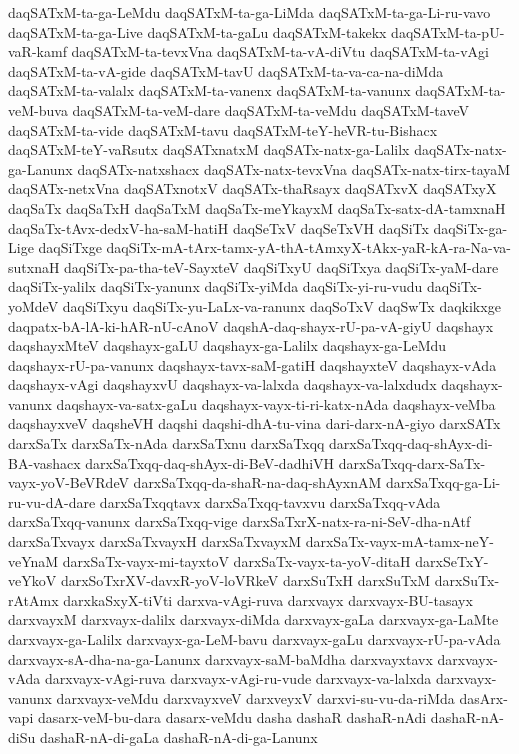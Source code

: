 {daqSATxM-ta-ga-LeMdu
daqSATxM-ta-ga-LiMda
daqSATxM-ta-ga-Li-ru-vavo
daqSATxM-ta-ga-Live
daqSATxM-ta-gaLu
daqSATxM-takekx
daqSATxM-ta-pU-vaR-kamf
daqSATxM-ta-tevxVna
daqSATxM-ta-vA-diVtu
daqSATxM-ta-vAgi
daqSATxM-ta-vA-gide
daqSATxM-tavU
daqSATxM-ta-va-ca-na-diMda
daqSATxM-ta-valalx
daqSATxM-ta-vanenx
daqSATxM-ta-vanunx
daqSATxM-ta-veM-buva
daqSATxM-ta-veM-dare
daqSATxM-ta-veMdu
daqSATxM-taveV
daqSATxM-ta-vide
daqSATxM-tavu
daqSATxM-teY-heVR-tu-Bishacx
daqSATxM-teY-vaRsutx
daqSATxnatxM
daqSATx-natx-ga-Lalilx
daqSATx-natx-ga-Lanunx
daqSATx-natxshacx
daqSATx-natx-tevxVna
daqSATx-natx-tirx-tayaM
daqSATx-netxVna
daqSATxnotxV
daqSATx-thaRsayx
daqSATxvX
daqSATxyX
daqSaTx
daqSaTxH
daqSaTxM
daqSaTx-meYkayxM
daqSaTx-satx-dA-tamxnaH
daqSaTx-tAvx-dedxV-ha-saM-hatiH
daqSeTxV
daqSeTxVH
daqSiTx
daqSiTx-ga-Lige
daqSiTxge
daqSiTx-mA-tArx-tamx-yA-thA-tAmxyX-tAkx-yaR-kA-ra-Na-va-sutxnaH
daqSiTx-pa-tha-teV-SayxteV
daqSiTxyU
daqSiTxya
daqSiTx-yaM-dare
daqSiTx-yalilx
daqSiTx-yanunx
daqSiTx-yiMda
daqSiTx-yi-ru-vudu
daqSiTx-yoMdeV
daqSiTxyu
daqSiTx-yu-LaLx-va-ranunx
daqSoTxV
daqSwTx
daqkikxge
daqpatx-bA-lA-ki-hAR-nU-cAnoV
daqshA-daq-shayx-rU-pa-vA-giyU
daqshayx
daqshayxMteV
daqshayx-gaLU
daqshayx-ga-Lalilx
daqshayx-ga-LeMdu
daqshayx-rU-pa-vanunx
daqshayx-tavx-saM-gatiH
daqshayxteV
daqshayx-vAda
daqshayx-vAgi
daqshayxvU
daqshayx-va-lalxda
daqshayx-va-lalxdudx
daqshayx-vanunx
daqshayx-va-satx-gaLu
daqshayx-vayx-ti-ri-katx-nAda
daqshayx-veMba
daqshayxveV
daqsheVH
daqshi
daqshi-dhA-tu-vina
dari-darx-nA-giyo
darxSATx
darxSaTx
darxSaTx-nAda
darxSaTxnu
darxSaTxqq
darxSaTxqq-daq-shAyx-di-BA-vashacx
darxSaTxqq-daq-shAyx-di-BeV-dadhiVH
darxSaTxqq-darx-SaTx-vayx-yoV-BeVRdeV
darxSaTxqq-da-shaR-na-daq-shAyxnAM
darxSaTxqq-ga-Li-ru-vu-dA-dare
darxSaTxqqtavx
darxSaTxqq-tavxvu
darxSaTxqq-vAda
darxSaTxqq-vanunx
darxSaTxqq-vige
darxSaTxrX-natx-ra-ni-SeV-dha-nAtf
darxSaTxvayx
darxSaTxvayxH
darxSaTxvayxM
darxSaTx-vayx-mA-tamx-neY-veYnaM
darxSaTx-vayx-mi-tayxtoV
darxSaTx-vayx-ta-yoV-ditaH
darxSeTxY-veYkoV
darxSoTxrXV-davxR-yoV-loVRkeV
darxSuTxH
darxSuTxM
darxSuTx-rAtAmx
darxkaSxyX-tiVti
darxva-vAgi-ruva
darxvayx
darxvayx-BU-tasayx
darxvayxM
darxvayx-dalilx
darxvayx-diMda
darxvayx-gaLa
darxvayx-ga-LaMte
darxvayx-ga-Lalilx
darxvayx-ga-LeM-bavu
darxvayx-gaLu
darxvayx-rU-pa-vAda
darxvayx-sA-dha-na-ga-Lanunx
darxvayx-saM-baMdha
darxvayxtavx
darxvayx-vAda
darxvayx-vAgi-ruva
darxvayx-vAgi-ru-vude
darxvayx-va-lalxda
darxvayx-vanunx
darxvayx-veMdu
darxvayxveV
darxveyxV
darxvi-su-vu-da-riMda
dasArx-vapi
dasarx-veM-bu-dara
dasarx-veMdu
dasha
dashaR
dashaR-nAdi
dashaR-nA-diSu
dashaR-nA-di-gaLa
dashaR-nA-di-ga-Lanunx
}
